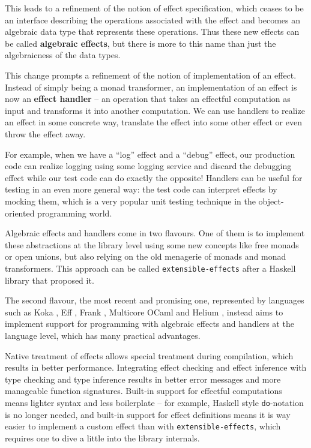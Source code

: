 \documentclass[declaration,inz,english,shortabstract]{iithesis}
\newcommand{\m}[1]{\texttt{#1}}
\begin{document}
This leads to a refinement of the notion of effect specification, which ceases to be an interface describing the operations associated with the effect and becomes an algebraic data type that represents these operations. Thus these new effects can be called \textbf{algebraic effects}, but there is more to this name than just the algebraicness of the data types.

This change prompts a refinement of the notion of implementation of an effect. Instead of simply being a monad transformer, an implementation of an effect is now an \textbf{effect handler} -- an operation that takes an effectful computation as input and transforms it into another computation. We can use handlers to realize an effect in some concrete way, translate the effect into some other effect or even throw the effect away.

For example, when we have a ``log'' effect and a ``debug'' effect, our production code can realize logging using some logging service and discard the debugging effect while our test code can do exactly the opposite! Handlers can be useful for testing in an even more general way: the test code can interpret effects by mocking them, which is a very popular unit testing technique in the object-oriented programming world.

Algebraic effects and handlers come in two flavours. One of them is to implement these abstractions at the library level using some new concepts like free monads or open unions, but also relying on the old menagerie of monads and monad transformers. This approach can be called \m{extensible-effects} after a Haskell library that proposed it. \cite{ExtensibleEffects} \cite{Freer}

The second flavour, the most recent and promising one, represented by languages such as Koka \cite{Koka}, Eff \cite{Eff}, Frank \cite{Frank}, Multicore OCaml \cite{MulticoreOCaml} and Helium \cite{Helium}, instead aims to implement support for programming with algebraic effects and handlers at the language level, which has many practical advantages.

Native treatment of effects allows special treatment during compilation, which results in better performance. Integrating effect checking and effect inference with type checking and type inference results in better error messages and more manageable function signatures. Built-in support for effectful computations means lighter syntax and less boilerplate -- for example, Haskell style \m{do}-notation is no longer needed, and built-in support for effect definitions means it is way easier to implement a custom effect than with \m{extensible-effects}, which requires one to dive a little into the library internals.
\end{document}
